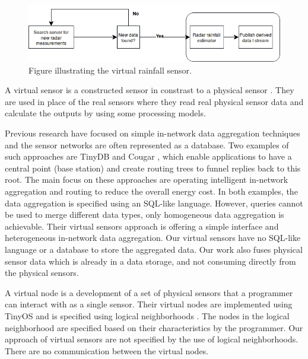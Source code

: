 \documentclass[USenglish]{uit-thesis}
\begin{document}
\begin{figure}
\centering
\includegraphics[width=\textwidth]{rainfall_sensor.png}
\caption{Figure illustrating the virtual rainfall sensor.}
\label{fig:rainfall_sensor}
\end{figure}


A virtual sensor is a constructed sensor in constrast to a physical sensor \cite{VirtualSensors2006}. They are used in place of the real sensors where they read real physical sensor data and calculate the outputs by using some processing models.

Previous research have focused on simple in-network data aggregation techniques and the sensor networks are often represented as a database. Two examples of such approaches are TinyDB \cite{tinyDB} and Cougar \cite{cougar}, which enable applications to have a central point (base station) and create routing trees  to funnel replies back to this root. The main focus on these approaches are operating intelligent in-network aggregation and routing to reduce  the overall energy cost.
In both examples, the data aggregation is specified using an SQL-like language. However, queries cannot be used to merge different data types, only homogeneous data aggregation is achievable.
Their virtual sensors approach is  offering a simple interface and heterogeneous in-network data aggregation. Our virtual sensors have no SQL-like language or a database to store the aggregated data. Our work also fuses physical sensor data which is already in a data storage, and not consuming directly from the physical sensors.


A virtual node\cite{Ciciriello} is a development of a set of physical sensors that a programmer can interact with as a single sensor. Their virtual nodes are implemented using TinyOS \cite{TinyOS} and is specified using logical neighborhoods \cite{Mottola2006}\cite{Mottola2006_2}. 
The nodes in the logical neighborhood are specified based on their characteristics by the programmer.
Our approach of virtual sensors are not specified by the use of logical neighborhoods. There are no communication between the virtual nodes.
\end{document}
